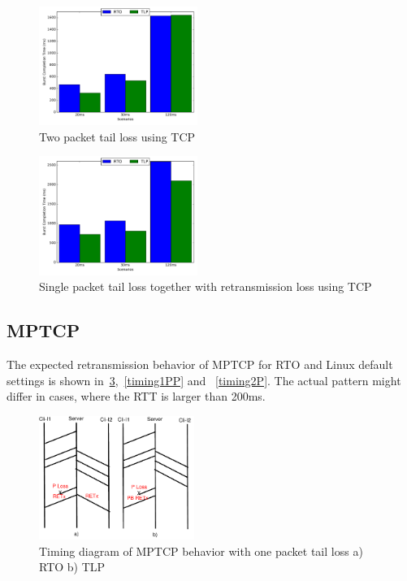 \documentclass[10pt,conference,compsoc]{IEEEtran}
\begin{document}
\begin{figure}[!ht]
\begin{center}
\includegraphics[angle=0, width=0.46\textwidth,natwidth=578.16,natheight=433.62]{plots/T2P.pdf}
\caption{Two packet tail loss using TCP}\label{t2p}
\end{center}
\end{figure}


\begin{figure}[!ht]
\begin{center}
\includegraphics[angle=0, width=0.46\textwidth, natwidth=578.16,natheight=433.62]{plots/T1PP.pdf}
\caption{Single packet tail loss together with retransmission loss using TCP}\label{t1pp}
\end{center}
\end{figure}

\subsection{MPTCP}


The expected retransmission behavior of MPTCP for RTO and Linux default settings is shown 
in~\ref{timing1P},~\ref{timing1PP} and ~\ref{timing2P}. The actual pattern might differ in cases,
where the RTT is larger than 200ms. 

\begin{figure}[!ht]
\begin{center}
\includegraphics[angle=0, width=0.45\textwidth, natwidth=610, natheight=400]{images/timing1P.pdf}
\end{center}
\caption{Timing diagram of MPTCP behavior with one packet tail loss a) RTO b) TLP}\label{timing1P}
\end{figure}
\end{document}
